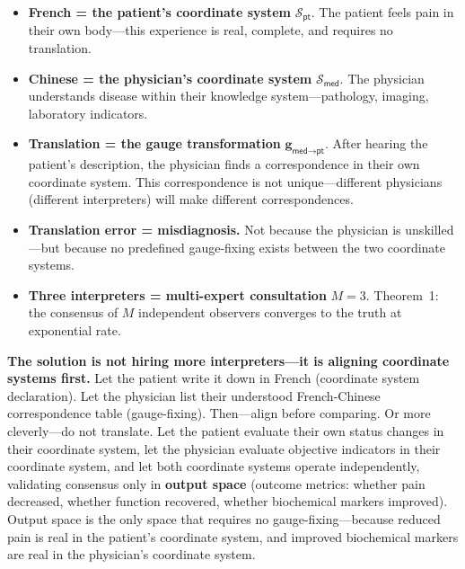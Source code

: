 \documentclass[12pt,a4paper]{article}
\theoremstyle{remark}
\newcommand{\med}{\textsf{med}}
\newcommand{\pt}{\textsf{pt}}
\begin{document}
\begin{center}
{\begin{minipage}{0.92\textwidth}
\begin{itemize}
    \item \textbf{French = the patient's coordinate system} $\mathcal{S}_{\pt}$. The patient feels pain in their own body---this experience is real, complete, and requires no translation.
    \item \textbf{Chinese = the physician's coordinate system} $\mathcal{S}_{\med}$. The physician understands disease within their knowledge system---pathology, imaging, laboratory indicators.
    \item \textbf{Translation = the gauge transformation} $\mathbf{g}_{\med \to \pt}$. After hearing the patient's description, the physician finds a correspondence in their own coordinate system. This correspondence is not unique---different physicians (different interpreters) will make different correspondences.
    \item \textbf{Translation error = misdiagnosis.} Not because the physician is unskilled---but because no predefined gauge-fixing exists between the two coordinate systems.
    \item \textbf{Three interpreters = multi-expert consultation} $M=3$. Theorem~1: the consensus of $M$ independent observers converges to the truth at exponential rate.
\end{itemize}

\textbf{The solution is not hiring more interpreters---it is aligning coordinate systems first.} Let the patient write it down in French (coordinate system declaration). Let the physician list their understood French-Chinese correspondence table (gauge-fixing). Then---align before comparing. Or more cleverly---do not translate. Let the patient evaluate their own status changes in their coordinate system, let the physician evaluate objective indicators in their coordinate system, and let both coordinate systems operate independently, validating consensus only in \textbf{output space} (outcome metrics: whether pain decreased, whether function recovered, whether biochemical markers improved). Output space is the only space that requires no gauge-fixing---because reduced pain is real in the patient's coordinate system, and improved biochemical markers are real in the physician's coordinate system.

\end{minipage}%
}
\end{center}

\vspace{8pt}
\end{document}
